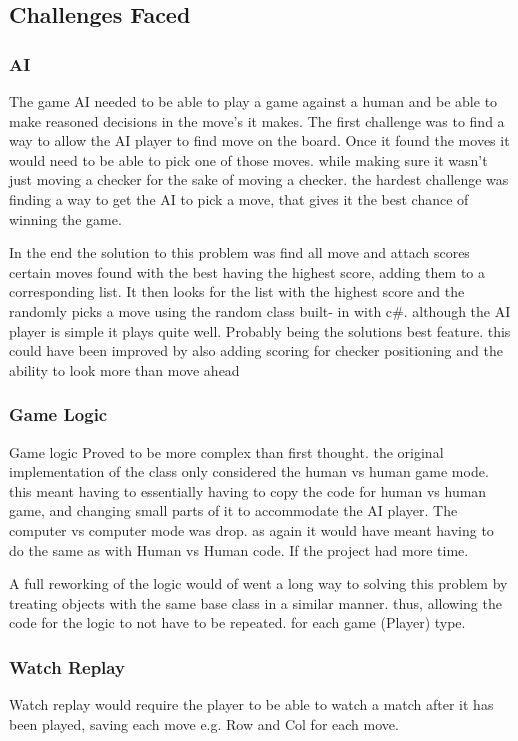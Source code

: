 \documentclass[10pt, a4paper]{article}
\begin{document}
	\subsection{Challenges Faced}	
	\subsubsection{AI}
The game AI needed to be able to play a game against a human and be able to make reasoned decisions in the move's it makes. The first challenge was to find a way to allow the AI player to find move on the board. Once it found the moves it would need to be able to pick one of those moves. while making sure it wasn't just moving a checker for the sake of moving a checker. the hardest challenge was finding a way to get the AI to pick a move, that gives it the best chance of winning the game.

In the end the solution to this problem was find all move and attach scores certain moves found with the best having the highest score, adding them to a corresponding list. It then looks for the list with the highest score and the randomly picks a move using the random class built- in with c\#. although the AI player is simple it plays quite well. Probably being the solutions best feature. this could have been improved by also adding scoring for checker positioning and the ability to look more than move ahead
	\subsubsection{Game Logic}
Game logic Proved to be more complex than first thought. the original implementation of the class only considered the human vs human game mode. this meant having to essentially having to copy the code for human vs human game, and changing small parts of it to accommodate the AI player. The computer vs computer mode was drop. as again it would have meant having to do the same as with Human vs Human code. If the project had more time.

A full reworking of the logic would of went a long way to solving this problem by treating objects with the same base class in a similar manner. thus, allowing the code for the logic to not have to be repeated. for each game (Player) type.
	\subsubsection{Watch Replay}
Watch replay would require the player to be able to watch a match after it has been played, saving each move e.g. Row and Col for each move.
\end{document}
